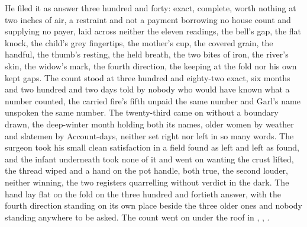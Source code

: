 He filed it as answer three hundred and forty: exact, complete, worth nothing at two inches of air, a restraint and not a payment borrowing no house count and supplying no payer, laid across neither the eleven readings, the bell's gap, the flat knock, the child's grey fingertips, the mother's cup, the covered grain, the handful, the thumb's resting, the held breath, the two bites of iron, the river's skin, the widow's mark, the fourth direction, the keeping at the fold nor his own kept gaps. The count stood at three hundred and eighty-two exact, six months and two hundred and two days told by nobody who would have known what a number counted, the carried fire's fifth unpaid the same number and Garl's name unspoken the same number. The twenty-third came on without a boundary drawn, the deep-winter month holding both its names, older women by weather and slatemen by Account-days, neither set right nor left in so many words. The surgeon took his small clean satisfaction in a field found as left and left as found, and the infant underneath took none of it and went on wanting the crust lifted, the thread wiped and a hand on the pot handle, both true, the second louder, neither winning, the two registers quarrelling without verdict in the dark. The hand lay flat on the fold on the three hundred and fortieth answer, with the fourth direction standing on its own place beside the three older ones and nobody standing anywhere to be asked. The count went on under the roof in , , .

